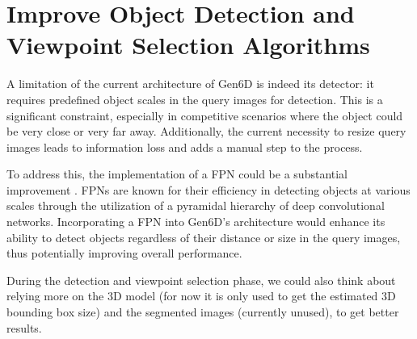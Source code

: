 \section{Improve Object Detection and Viewpoint Selection Algorithms}

A limitation of the current architecture of Gen6D is indeed its detector: it requires predefined object scales in the query images for detection. This is a significant constraint, especially in competitive scenarios where the object could be very close or very far away. Additionally, the current necessity to resize query images leads to information loss and adds a manual step to the process.

To address this, the implementation of a \ac{FPN} could be a substantial improvement \cite{lin2017feature}. \ac{FPN}s are known for their efficiency in detecting objects at various scales through the utilization of a pyramidal hierarchy of deep convolutional networks. Incorporating a FPN into Gen6D's architecture would enhance its ability to detect objects regardless of their distance or size in the query images, thus potentially improving overall performance.

During the detection and viewpoint selection phase, we could also think about relying more on the 3D model (for now it is only used to get the estimated 3D bounding box size) and the segmented images (currently unused), to get better results.
